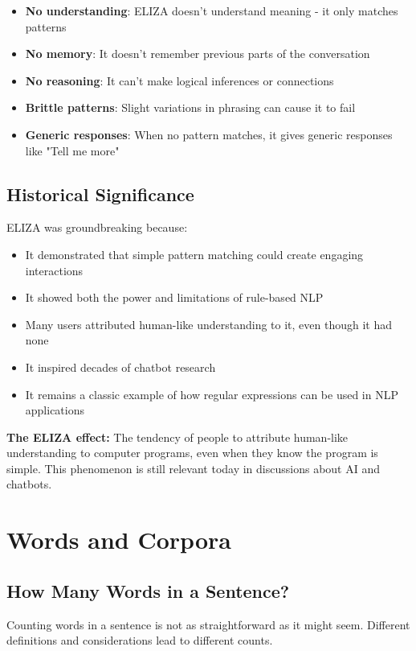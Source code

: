\documentclass[11pt,a4paper]{article}
\theoremstyle{definition}
\theoremstyle{plain}
\theoremstyle{remark}
\begin{document}
\begin{itemize}
    \item \textbf{No understanding}: ELIZA doesn't understand meaning - it only matches patterns
    \item \textbf{No memory}: It doesn't remember previous parts of the conversation
    \item \textbf{No reasoning}: It can't make logical inferences or connections
    \item \textbf{Brittle patterns}: Slight variations in phrasing can cause it to fail
    \item \textbf{Generic responses}: When no pattern matches, it gives generic responses like "Tell me more"
\end{itemize}

\subsection{Historical Significance}

ELIZA was groundbreaking because:
\begin{itemize}
    \item It demonstrated that simple pattern matching could create engaging interactions
    \item It showed both the power and limitations of rule-based NLP
    \item Many users attributed human-like understanding to it, even though it had none
    \item It inspired decades of chatbot research
    \item It remains a classic example of how regular expressions can be used in NLP applications
\end{itemize}

\textbf{The ELIZA effect:} The tendency of people to attribute human-like understanding to computer programs, even when they know the program is simple. This phenomenon is still relevant today in discussions about AI and chatbots.

\section{Words and Corpora}

\subsection{How Many Words in a Sentence?}

Counting words in a sentence is not as straightforward as it might seem. Different definitions and considerations lead to different counts.
\end{document}
